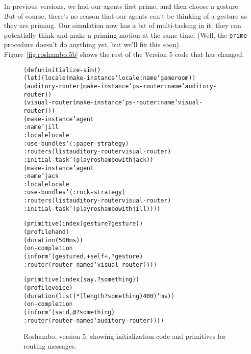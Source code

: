 \documentclass[12pt]{article}
\newcommand{\ic}{\texttt}
\newenvironment{code}%
   {\begin{alltt}}%
   {\end{alltt}}
\newenvironment{float}%
   {\begin{center}}%
   {\end{center}
   }
\begin{document}
In previous versions, we had our agents first prime, and then choose a gesture. But of course, there's no reason that our agents can't be thinking of a gesture as they are priming. Our simulation now has a bit of multi-tasking in it: they can potentially think and make a priming motion at the same time. (Well, the \ic{prime} procedure doesn't do anything yet, but we'll fix this soon). Figure~\ref{fig.roshambo.5b} shows the rest of the Version 5 code that has changed.

\begin{figure}
\begin{float}
\begin{code}
(defun initialize-sim ()
  (let ((locale (make-instance 'locale :name 'gameroom))
        (auditory-router (make-instance 'ps-router :name 'auditory-router))
        (visual-router (make-instance 'ps-router :name 'visual-router)))
    (make-instance 'agent
      :name 'jill
      :locale locale
      :use-bundles '(:paper-strategy)
      :routers (list auditory-router visual-router)
      :initial-task '(play roshambo with jack))
    (make-instance 'agent
      :name 'jack
      :locale locale
      :use-bundles '(:rock-strategy)
      :routers (list auditory-router visual-router)
      :initial-task '(play roshambo with jill))))

(primitive (index (gesture ?gesture))
  (profile hand)
  (duration (500 ms))
  (on-completion 
   (inform `(gestured ,+self+ ,?gesture)
     :router (router-named 'visual-router))))			    

(primitive (index (say . ?something))
  (profile voice)
  (duration (list (* (length ?something) 400) 'ms))
  (on-completion 
   (inform `(said ,@?something)
     :router (router-named 'auditory-router))))
\end{code}
\end{float}
\caption{Roshambo, version 5, showing initialization code and primitives for routing messages.\label{fig.roshambo.5a}}
\end{figure}
\end{document}
